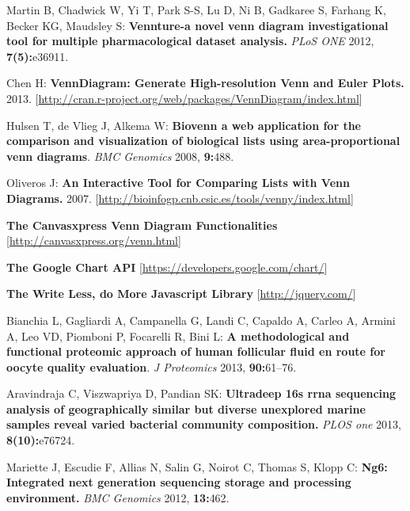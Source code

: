 \documentclass[11pt]{bmc_article_s50}
\begin{document}
\begin{thebibliography}{18}
Martin B,
Chadwick W,
Yi T,
Park S-S,
Lu D,
Ni B,
Gadkaree S,
Farhang K,
Becker KG,
Maudsley S:
\textbf{Vennture-a novel venn diagram investigational tool for multiple pharmacological
  dataset analysis.}
\textit{PLoS ONE} 2012,
\textbf{7(5):}{e36911}.

Chen H:
\textbf{VennDiagram: Generate High-resolution Venn and Euler Plots.}
2013.
{[\url{http://cran.r-project.org/web/packages/VennDiagram/index.html}]}


Hulsen T,
{de} Vlieg J,
Alkema W:
\textbf{Biovenn a web application for the comparison and visualization of
  biological lists using area-proportional venn diagrams}.
\textit{BMC Genomics} 2008,
\textbf{9:}{488}.




Oliveros J:
\textbf{An Interactive Tool for Comparing Lists with Venn Diagrams.}
2007.
{[\url{http://bioinfogp.cnb.csic.es/tools/venny/index.html}]}


\textbf{The Canvasxpress Venn Diagram Functionalities}
{[\url{http://canvasxpress.org/venn.html}]}


\textbf{The Google Chart API}
{[\url{https://developers.google.com/chart/}]}




\textbf{The Write Less, do More Javascript Library}
{[\url{http://jquery.com/}]}


Bianchia L,
Gagliardi A,
Campanella G,
Landi C,
Capaldo A,
Carleo A,
Armini A,
Leo VD,
Piomboni P,
Focarelli R,
Bini L:
\textbf{A methodological and functional proteomic approach of human follicular
  fluid en route for oocyte quality evaluation}.
\textit{J Proteomics} 2013,
\textbf{90:}{61}--{76}.




Aravindraja C,
Viszwapriya D,
Pandian SK:
\textbf{Ultradeep 16s rrna sequencing analysis of geographically similar but diverse
unexplored marine samples reveal varied bacterial community composition.}
\textit{PLOS one} 2013,
\textbf{8(10):}{e76724}.


Mariette J,
Escudie F,
Allias N,
Salin G,
Noirot C,
Thomas S,
Klopp C:
\textbf{Ng6: Integrated next generation sequencing storage and processing environment.}
\textit{BMC Genomics} 2012,
\textbf{13:}{462}.



\end{thebibliography}
\end{document}
